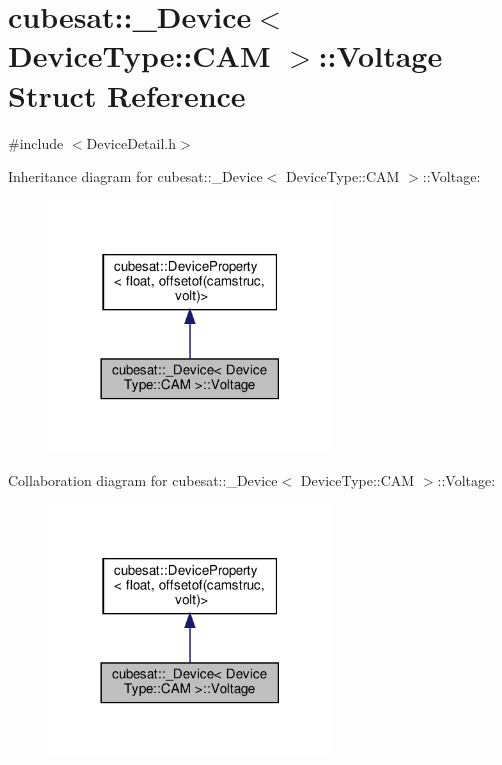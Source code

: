 \hypertarget{structcubesat_1_1__Device_3_01DeviceType_1_1CAM_01_4_1_1Voltage}{}\section{cubesat\+:\+:\+\_\+\+Device$<$ Device\+Type\+:\+:C\+AM $>$\+:\+:Voltage Struct Reference}
\label{structcubesat_1_1__Device_3_01DeviceType_1_1CAM_01_4_1_1Voltage}


{\ttfamily \#include $<$Device\+Detail.\+h$>$}



Inheritance diagram for cubesat\+:\+:\+\_\+\+Device$<$ Device\+Type\+:\+:C\+AM $>$\+:\+:Voltage\+:\nopagebreak
\begin{figure}[H]
\begin{center}
\leavevmode
\includegraphics[width=213pt]{structcubesat_1_1__Device_3_01DeviceType_1_1CAM_01_4_1_1Voltage__inherit__graph}
\end{center}
\end{figure}


Collaboration diagram for cubesat\+:\+:\+\_\+\+Device$<$ Device\+Type\+:\+:C\+AM $>$\+:\+:Voltage\+:\nopagebreak
\begin{figure}[H]
\begin{center}
\leavevmode
\includegraphics[width=213pt]{structcubesat_1_1__Device_3_01DeviceType_1_1CAM_01_4_1_1Voltage__coll__graph}
\end{center}
\end{figure}
